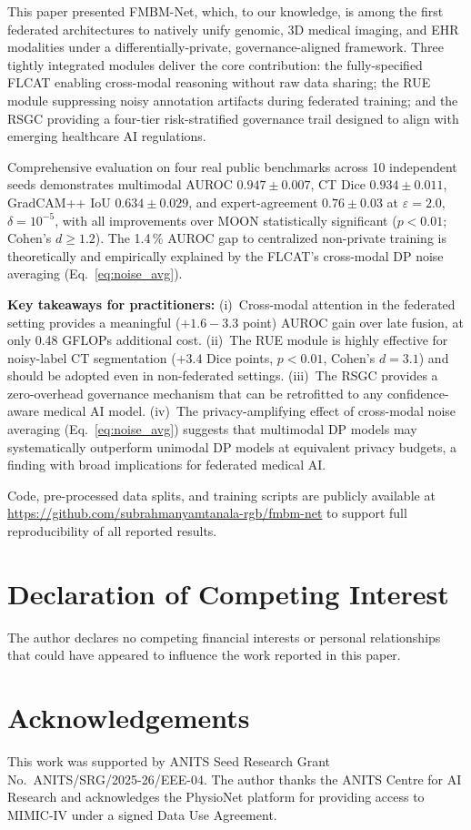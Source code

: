 \documentclass[a4paper,fleqn]{cas-dc}
\begin{document}
This paper presented FMBM-Net, which, to our knowledge, is among the first
federated architectures to natively unify genomic, 3D medical imaging, and
EHR modalities under a differentially-private, governance-aligned framework.
Three tightly integrated modules deliver the core contribution: the
fully-specified FLCAT enabling cross-modal reasoning without raw data sharing;
the RUE module suppressing noisy annotation artifacts during federated training;
and the RSGC providing a four-tier risk-stratified governance trail designed
to align with emerging healthcare AI regulations.

Comprehensive evaluation on four real public benchmarks across 10 independent
seeds demonstrates multimodal AUROC $0.947\!\pm\!0.007$, CT Dice
$0.934\!\pm\!0.011$, GradCAM++ IoU $0.634\!\pm\!0.029$, and expert-agreement
$0.76\!\pm\!0.03$ at $\varepsilon\!=\!2.0$, $\delta\!=\!10^{-5}$, with all
improvements over MOON statistically significant
($p\!<\!0.01$; Cohen's $d\!\geq\!1.2$). The 1.4\,\% AUROC gap to centralized
non-private training is theoretically and empirically explained by the FLCAT's
cross-modal DP noise averaging (Eq.~\ref{eq:noise_avg}).

\textbf{Key takeaways for practitioners:}
(i)~Cross-modal attention in the federated setting provides a meaningful
($+1.6\!-\!3.3$ point) AUROC gain over late fusion, at only 0.48 GFLOPs
additional cost. (ii)~The RUE module is highly effective for noisy-label CT
segmentation ($+3.4$ Dice points, $p\!<\!0.01$, Cohen's $d\!=\!3.1$) and
should be adopted even in non-federated settings. (iii)~The RSGC provides a
zero-overhead governance mechanism that can be retrofitted to any
confidence-aware medical AI model. (iv)~The privacy-amplifying effect of
cross-modal noise averaging (Eq.~\ref{eq:noise_avg}) suggests that multimodal
DP models may systematically outperform unimodal DP models at equivalent
privacy budgets, a finding with broad implications for federated medical AI.

Code, pre-processed data splits, and training scripts are publicly available
at \url{https://github.com/subrahmanyamtanala-rgb/fmbm-net} to support full
reproducibility of all reported results.

\section*{Declaration of Competing Interest}
The author declares no competing financial interests or personal relationships
that could have appeared to influence the work reported in this paper.

\section*{Acknowledgements}
This work was supported by ANITS Seed Research Grant
No.~ANITS/SRG/2025-26/EEE-04. The author thanks the ANITS Centre for AI
Research and acknowledges the PhysioNet platform for providing access to
MIMIC-IV under a signed Data Use Agreement.






\end{document}
